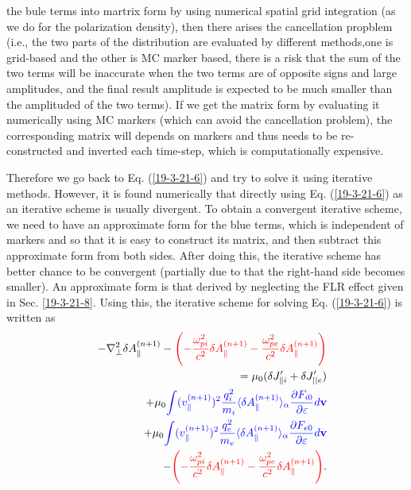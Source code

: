 \documentclass{article}
\newcommand{\tmcolor}[2]{{\color{#1}{#2}}}
\begin{document}
the bule terms into martrix form by using numerical spatial grid integration
(as we do for the polarization density), then there arises the cancellation
propblem (i.e., the two parts of the distribution are evaluated by different
methods,one is grid-based and the other is MC marker based, there is a risk
that the sum of the two terms will be inaccurate when the two terms are of
opposite signs and large amplitudes, and the final result amplitude is
expected to be much smaller than the amplituded of the two terms). If we get
the matrix form by evaluating it numerically using MC markers (which can avoid
the cancellation problem), the corresponding matrix will depends on markers
and thus needs to be re-constructed and inverted each time-step, which is
computationally expensive.

Therefore we go back to Eq. (\ref{19-3-21-6}) and try to solve it using
iterative methods. However, it is found numerically that directly using Eq.
(\ref{19-3-21-6}) as an iterative scheme is usually divergent. To obtain a
convergent iterative scheme, we need to have an approximate form for the blue
terms, which is independent of markers and so that it is easy to construct its
matrix, and then subtract this approximate form from both sides. After doing
this, the iterative scheme has better chance to be convergent (partially due
to that the right-hand side becomes smaller). An approximate form is that
derived by neglecting the FLR effect given in Sec. \ref{19-3-21-8}. Using
this, the iterative scheme for solving Eq. (\ref{19-3-21-6}) is written as
\begin{eqnarray}
  &  & - \nabla^2_{\perp} \delta A_{\parallel}^{(n + 1)} -
  \tmcolor{red}{\left( - \frac{\omega_{p i}^2}{c^2} \delta A_{\parallel}^{(n +
  1)} - \frac{\omega_{p e}^2}{c^2} \delta A_{\parallel}^{(n + 1)} \right)}
  \nonumber\\
  &  & = \mu_0  (\delta J_{\parallel i}' + \delta J'_{||e}) \nonumber\\
  &  & + \mu_0 \tmcolor{blue}{\int (v_{\parallel}^{(n + 1)})^2
  \frac{q^2_i}{m_i} \langle \delta A_{\parallel}^{(n + 1)} \rangle_{\alpha}
  \frac{\partial F_{i 0}}{\partial \varepsilon} d\mathbf{v}} \nonumber\\
  &  & + \mu_0 \tmcolor{blue}{\int (v_{\parallel}^{(n + 1)})^2
  \frac{q^2_e}{m_e} \langle \delta A_{\parallel}^{(n + 1)} \rangle_{\alpha}
  \frac{\partial F_{e 0}}{\partial \varepsilon} d\mathbf{v}} \nonumber\\
  &  & - \tmcolor{red}{\left( - \frac{\omega_{p i}^2}{c^2} \delta
  A_{\parallel}^{(n + 1)} - \frac{\omega_{p e}^2}{c^2} \delta
  A_{\parallel}^{(n + 1)} \right)} .  \label{19-3-21-p1}
\end{eqnarray}
\end{document}
